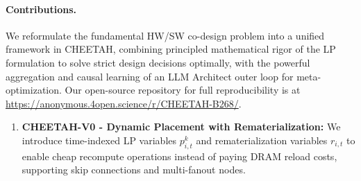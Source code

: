 \paragraph{Contributions.} We reformulate the fundamental HW/SW co-design problem into a unified  framework in CHEETAH, combining principled mathematical rigor of the LP formulation to solve strict design decisions optimally, with the powerful aggregation and causal learning of an LLM Architect outer loop for meta-optimization. Our open-source repository for full reproducibility is at \href{https://anonymous.4open.science/r/CHEETAH-B268/readme}{https://anonymous.4open.science/r/CHEETAH-B268/}.

\begin{enumerate}
    \item \textbf{CHEETAH-V0 - Dynamic Placement with Rematerialization:}
    We introduce time-indexed LP variables $p_{i,t}^k$ and rematerialization variables $r_{i,t}$ to enable cheap recompute operations instead of paying DRAM reload costs, supporting skip connections and multi-fanout nodes.


\end{enumerate}
